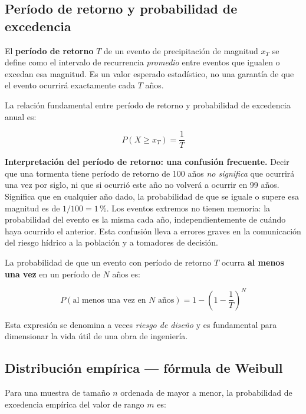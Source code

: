 \documentclass[11pt]{article}
\begin{document}
\subsection*{Período de retorno y probabilidad de excedencia}

El \textbf{período de retorno} $T$ de un evento de precipitación de magnitud $x_T$
se define como el intervalo de recurrencia \emph{promedio} entre eventos que igualen
o excedan esa magnitud.  Es un valor esperado estadístico, no una garantía de que
el evento ocurrirá exactamente cada $T$ años.

La relación fundamental entre período de retorno y probabilidad de excedencia anual es:

\begin{equation}
  P(X \geq x_T) = \frac{1}{T}
  \label{eq:retorno}
\end{equation}

\begin{infobox}
\textbf{Interpretación del período de retorno: una confusión frecuente.}
Decir que una tormenta tiene período de retorno de 100 años \emph{no significa} que
ocurrirá una vez por siglo, ni que si ocurrió este año no volverá a ocurrir en 99
años.  Significa que en cualquier año dado, la probabilidad de que se iguale o supere
esa magnitud es de $1/100 = 1$\,\%.  Los eventos extremos no tienen memoria:
la probabilidad del evento es la misma cada año, independientemente de cuándo
haya ocurrido el anterior.  Esta confusión lleva a errores graves en la comunicación
del riesgo hídrico a la población y a tomadores de decisión.
\end{infobox}

La probabilidad de que un evento con período de retorno $T$ ocurra
\textbf{al menos una vez} en un período de $N$ años es:

\begin{equation}
  P(\text{al menos una vez en } N \text{ años}) = 1 - \left(1 - \frac{1}{T}\right)^N
  \label{eq:riesgo}
\end{equation}

Esta expresión se denomina a veces \emph{riesgo de diseño} y es fundamental para
dimensionar la vida útil de una obra de ingeniería.

\subsection*{Distribución empírica — fórmula de Weibull}

Para una muestra de tamaño $n$ ordenada de mayor a menor, la probabilidad de
excedencia empírica del valor de rango $m$ es:
\end{document}
